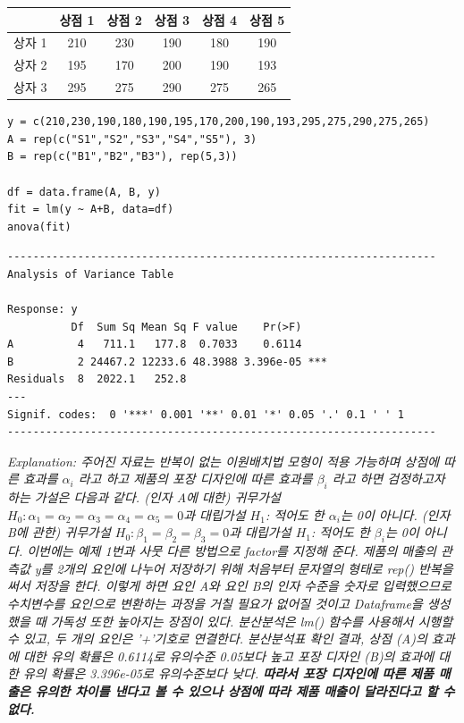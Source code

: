 \documentclass{article}
\begin{document}
\begin{table}[htb!]
\centering
\begin{tabularx}{0.7\textwidth}{@{\extracolsep{\fill}}c|ccccc}
& 상점 1 & 상점 2 & 상점 3 & 상점 4 & 상점 5 \\ \hline
상자 1 & 210 & 230 & 190 & 180 & 190 \\
상자 2 & 195 & 170 & 200 & 190 & 193 \\
상자 3 & 295 & 275 & 290 & 275 & 265 \\
\end{tabularx}
\end{table}
\begin{lstlisting}[style={r-style}]
y = c(210,230,190,180,190,195,170,200,190,193,295,275,290,275,265)
A = rep(c("S1","S2","S3","S4","S5"), 3)
B = rep(c("B1","B2","B3"), rep(5,3))

df = data.frame(A, B, y)
fit = lm(y ~ A+B, data=df)
anova(fit)
\end{lstlisting}
\begin{lstlisting}[style={out-style}]
-------------------------------------------------------------------                 
Analysis of Variance Table

Response: y
          Df  Sum Sq Mean Sq F value    Pr(>F)    
A          4   711.1   177.8  0.7033    0.6114    
B          2 24467.2 12233.6 48.3988 3.396e-05 ***
Residuals  8  2022.1   252.8 
---
Signif. codes:  0 '***' 0.001 '**' 0.01 '*' 0.05 '.' 0.1 ' ' 1
-------------------------------------------------------------------
\end{lstlisting}
\emph{Explanation: 주어진 자료는 반복이 없는 이원배치법 모형이 적용 가능하며 상점에 따른 효과를 $\alpha_i$
라고 하고 제품의 포장 디자인에 따른 효과를 $\beta_i$ 라고 하면 검정하고자 하는 가설은 다음과 같다. (인자 A에 대한) 귀무가설 $H_0: \alpha_1=\alpha_2=\alpha_3=\alpha_4=\alpha_5=0$과 대립가설 $H_1$: 적어도 한 $\alpha_i$는 0이 아니다. (인자 B에 관한) 귀무가설 $H_0: \beta_1=\beta_2=\beta_3=0$과 대립가설 $H_1$: 적어도 한 $\beta_i$는 0이 아니다. 이번에는 예제 1번과 사뭇 다른 방법으로 factor를 지정해 준다. 제품의 매출의 관측값 y를 2개의 요인에 나누어 저장하기 위해 처음부터 문자열의 형태로 rep() 반복을 써서 저장을 한다. 이렇게 하면 요인 A와 요인 B의 인자 수준을 숫자로 입력했으므로 수치변수를 요인으로 변환하는 과정을 거칠 필요가 없어질 것이고 Dataframe을 생성했을 때 가독성 또한 
높아지는 장점이 있다. 분산분석은 lm() 함수를 사용해서 시행할 수 있고, 두 개의 요인은 '+'기호로 연결한다. 분산분석표 확인 결과, 상점 (A)의 효과에 대한 유의 확률은 0.6114로 유의수준 0.05보다 높고 포장 디자인 (B)의
효과에 대한 유의 확률은 3.396e-05로 유의수준보다 낮다. \textbf{따라서 포장 디자인에 따른 제품 매출은 유의한 차이를 낸다고 볼 수 있으나 상점에 따라 제품 매출이 달라진다고 할 수 없다.} } \\
\end{document}
